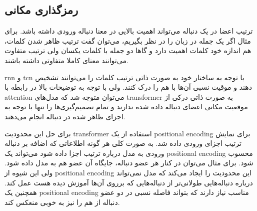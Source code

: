\subsection{رمزگذاری مکانی}
ترتیب اعضا در یک دنباله می‌تواند اهمیت بالایی در معنا دنباله ورودی داشته باشد.
برای مثال اگر یک جمله در زبان را در نظر بگیریم، می‌توان گفت ترتیب ظاهر شدن
کلمات، هم اندازه خود کلمات اهمیت دارد و گاها دو جمله با کلمات یکسان ولی ترتیب
متفاوت می‌توانند معنای کاملا متفاوتی داشته باشند.

\gls{rnn} و \gls{tcn} با توجه به ساختار خود به صورت ذاتی ترتیب کلمات را
می‌توانند تشخیص دهند و موقیت نسبی آن‌ها با هم را درک کنند. ولی با توجه به
توضیحات بالا در رابطه با \gls{attention} می‌توان متوجه شد که مدل‌های
\gls{transformer} به صورت ذاتی درکی از موقعیت مکانی اعضای دنباله داده شده ندارند
و تمام تصمیم‌گیری‌ها را تنها با توجه به اجزای ظاهر شده در دنباله انجام می‌دهند.

برای حل این محدودیت \gls{transformer} استفاده از یک \gls{positional encoding}
برای نمایش ترتیب اجزای ورودی داده شد. به صورت کلی هر گونه اطلاعاتی که اضافه بر
دنباله ورودی به مدل درباره ترتیب اجزا داده شود می‌تواند یک \gls{positional
encoding} محسوب شود. برای مثال می‌توان در کنار هر عضو دنباله، جایگاه آن عضو هم
به مدل داده شود. ولی این شیوه از \gls{positional encoding} این محدودیت را ایجاد
می‌کند که مدل نمی‌تواند درباره دنباله‌هایی طولانی‌تر از دنباله‌هایی که برروی
آن‌ها آموزش دیده هست عمل کند. همچنین یک \gls{positional encoding} مناسب نیاز
دارند که بتواند فاصله نسبی در دو عضو دنباله از هم را نیز به خوبی منعکس کند.

